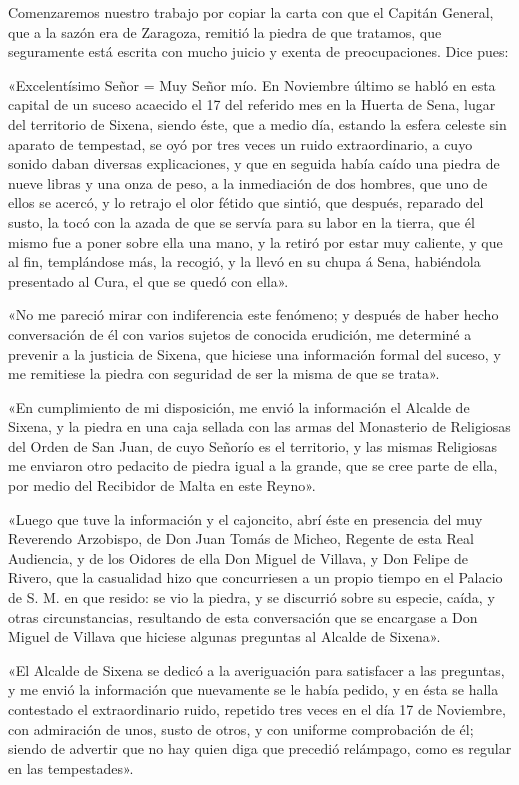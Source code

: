 \documentclass[a4paper, 12pt, oneside, spanish]{article}
\begin{document}
Comenzaremos nuestro trabajo por copiar la carta con que el Capitán General, que a la sazón era de Zaragoza, remitió la piedra de que tratamos, que seguramente está escrita con mucho juicio y exenta de preocupaciones. Dice pues:

«Excelentísimo Señor = Muy Señor mío. En Noviembre último se habló en esta capital de un suceso acaecido el 17 del referido mes en la Huerta de Sena, lugar del territorio de Sixena, siendo éste, que a medio día, estando la esfera celeste sin aparato de tempestad, se oyó por tres veces un ruido extraordinario, a cuyo sonido daban diversas explicaciones, y que en seguida había caído una piedra de nueve libras y una onza de peso, a la inmediación de dos hombres, que uno de ellos se acercó, y lo retrajo el olor fétido que sintió, que después, reparado del susto, la tocó con la azada de que se servía para su labor en la tierra, que él mismo fue a poner sobre ella una mano, y la retiró por estar muy caliente, y que al fin, templándose más, la recogió, y la llevó en su chupa á Sena, habiéndola presentado al Cura, el que se quedó con ella».

«No me pareció mirar con indiferencia este fenómeno; y después de haber hecho conversación de él con varios sujetos de conocida erudición, me determiné a prevenir a la justicia de Sixena, que hiciese una información formal del suceso, y me remitiese la piedra con seguridad de ser la misma de que se trata».

«En cumplimiento de mi disposición, me envió la información el Alcalde de Sixena, y la piedra en una caja sellada con las armas del Monasterio de Religiosas del Orden de San Juan, de cuyo Señorío es el territorio, y las mismas Religiosas me enviaron otro pedacito de piedra igual a la grande, que se cree parte de ella, por medio del Recibidor de Malta en este Reyno».

«Luego que tuve la información y el cajoncito, abrí éste en presencia del muy Reverendo Arzobispo, de Don Juan Tomás de Micheo, Regente de esta Real Audiencia, y de los Oidores de ella Don Miguel de Villava, y Don Felipe de Rivero, que la casualidad hizo que concurriesen a un propio tiempo en el Palacio de S. M. en que resido: se vio la piedra, y se discurrió sobre su especie, caída, y otras circunstancias, resultando de esta conversación que se encargase a Don Miguel de Villava que hiciese algunas preguntas al Alcalde de Sixena».

«El Alcalde de Sixena se dedicó a la averiguación para satisfacer a las preguntas, y me envió la información que nuevamente se le había pedido, y en ésta se halla contestado el extraordinario ruido, repetido tres veces en el día 17 de Noviembre, con admiración de unos, susto de otros, y con uniforme comprobación de él; siendo de advertir que no hay quien diga que precedió relámpago, como es regular en las tempestades».
\end{document}
